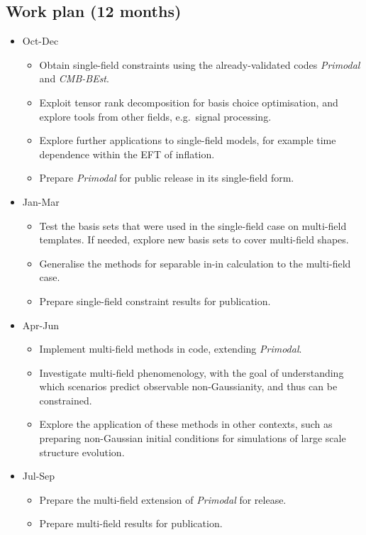 \subsection*{Work plan (12 months)}
\begin{itemize}
	\item Oct-Dec
	\begin{itemize}
        \item Obtain single-field constraints using the already-validated codes \textit{Primodal} and \textit{CMB-BEst}.
        \item Exploit tensor rank decomposition for basis choice optimisation, and explore tools from other fields, e.g.~signal processing.
        \item Explore further applications to single-field models, for example time dependence within the EFT of inflation.
        \item Prepare \textit{Primodal} for public release in its single-field form.
	\end{itemize}
	\item Jan-Mar
	\begin{itemize}
        \item Test the basis sets that were used in the single-field case on multi-field templates.
            If needed, explore new basis sets to cover multi-field shapes.
        \item Generalise the methods for separable in-in calculation to the multi-field case.
        \item Prepare single-field constraint results for publication.
	\end{itemize}
	\item Apr-Jun
	\begin{itemize}
        \item Implement multi-field methods in code, extending \textit{Primodal}.
        \item Investigate multi-field phenomenology, with the goal of understanding which scenarios predict observable non-Gaussianity, and thus can be constrained.
        \item Explore the application of these methods in other contexts, such as preparing non-Gaussian initial conditions for simulations of large scale structure evolution.
	\end{itemize}
	\item Jul-Sep
	\begin{itemize}
        \item Prepare the multi-field extension of \textit{Primodal} for release.
        \item Prepare multi-field results for publication.
	\end{itemize}
\end{itemize}

